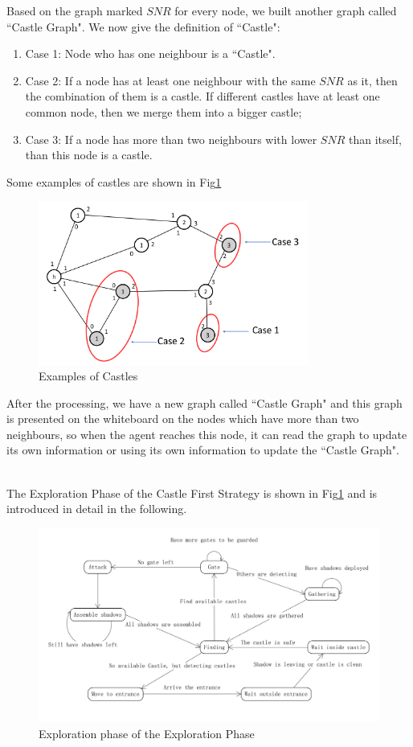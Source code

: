 Based on the graph marked $SNR$ for every node, we built another graph called ``Castle Graph". 
We now give the definition of ``Castle":
\begin{enumerate}
\item Case 1: Node who has one neighbour is a ``Castle".
\item Case 2: If a node has at least one neighbour with the same $SNR$ as it, then the combination of them is a castle. If different castles have at least one common node, then we merge them into a bigger castle;
\item Case 3: If a node has more than two neighbours with lower $SNR$ than itself, than this node is a castle.
\end{enumerate}

Some examples of castles are shown in Fig\ref{fig:CastleExample}
\begin{figure}[H]
  \centering  
  \includegraphics[width=3.5in]{figures/CastleExample.png}
  \caption{Examples of Castles}\label{fig:CastleExample}
\end{figure} 

After the processing, we have a new graph called ``Castle Graph" and this graph is presented on the whiteboard on the nodes which have more than two neighbours, so when the agent reaches this node, it can read the graph to update its own information or using its own information to update the ``Castle Graph". 

\\
The Exploration Phase of the Castle First Strategy is shown in Fig\ref{fig:CastleExample} and is introduced in detail in the following.
\begin{figure}[H]
  \centering  
  \includegraphics[width=6.0in]{figures/castlestates.png}
  \caption{Exploration phase of the Exploration Phase}\label{fig:castlestates}
\end{figure} 
 
